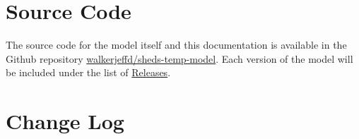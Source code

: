 \documentclass[]{book}
\begin{document}
\hypertarget{source-code}{%
\section{Source Code}\label{source-code}}

The source code for the model itself and this documentation is available in the Github repository \href{https://github.com/walkerjeffd/sheds-temp-model}{walkerjeffd/sheds-temp-model}. Each version of the model will be included under the list of \href{https://github.com/walkerjeffd/sheds-temp-model/releases}{Releases}.

\hypertarget{change-log}{%
\section{Change Log}\label{change-log}}
\end{document}
